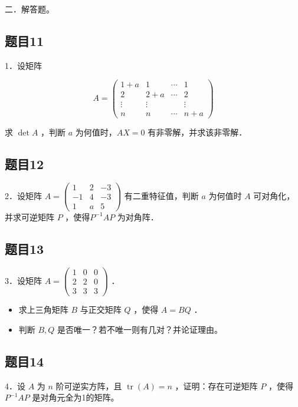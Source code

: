 \documentclass{article}
\begin{document}
二．解答题。\\

\subsection{题目11}
1．设矩阵

\[
A=\left(\begin{array}{cccc}
1+a & 1 & \cdots & 1 \\
2 & 2+a & \cdots & 2 \\
\vdots & \vdots & & \vdots \\
n & n & \cdots & n+a
\end{array}\right)
\]

求 \(\operatorname{det} A\) ，判断 \(a\) 为何值时，\(A X=0\) 有非零解，并求该非零解．

\subsection{题目12}
2．设矩阵 \(A=\left(\begin{array}{ccc}1 & 2 & -3 \\ -1 & 4 & -3 \\ 1 & a & 5\end{array}\right)\) 有二重特征值，判断 \(a\) 为何值时 \(A\) 可对角化，并求可逆矩阵 \(P\) ，使得\(P^{-1} A P\) 为对角阵．

\subsection{题目13}
3．设矩阵 \(A=\left(\begin{array}{lll}1 & 0 & 0 \\ 2 & 2 & 0 \\ 3 & 3 & 3\end{array}\right)\) ．

\begin{itemize}
  \item[（1）] 求上三角矩阵 \(B\) 与正交矩阵 \(Q\) ，使得 \(A=B Q\) ．
  \item[（2）] 判断 \(B, Q\) 是否唯一？若不唯一则有几对？并论证理由。
\end{itemize}

\subsection{题目14}
4．设 \(A\) 为 \(n\) 阶可逆实方阵，且 \(\operatorname{tr}(A)=n\) ，证明：存在可逆矩阵 \(P\) ，使得 \(P^{-1} A P\) 是对角元全为1的矩阵。
\end{document}
